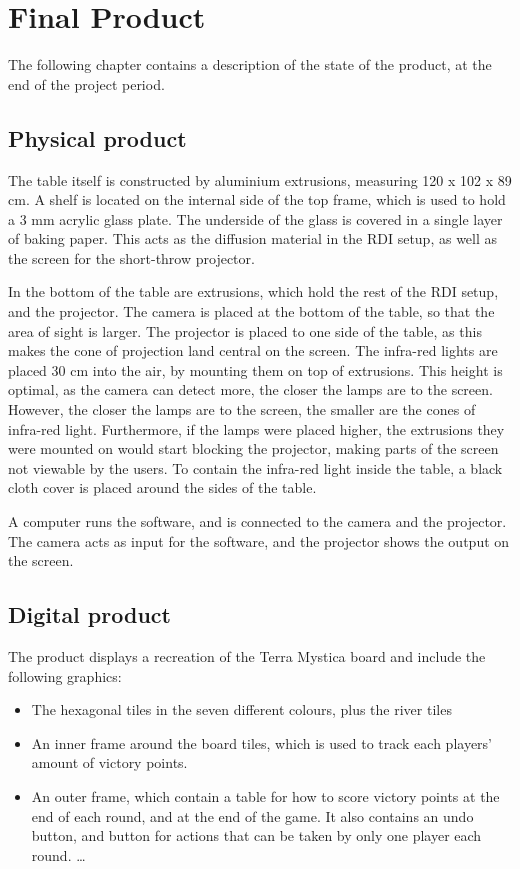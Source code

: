 \chapter{Final Product}\label{ch:finproduct}
The following chapter contains a description of the state of the product, at the end of the project period.

\section{Physical product}
The table itself is constructed by aluminium extrusions, measuring 120 x 102 x 89 cm. A shelf is located on the internal side of the top frame, which is used to hold a 3 mm acrylic glass plate. The underside of the glass is covered in a single layer of baking paper. This acts as the diffusion material in the RDI setup, as well as the screen for the short-throw projector.

In the bottom of the table are extrusions, which hold the rest of the RDI setup, and the projector. The camera is placed at the bottom of the table, so that the area of sight is larger. The projector is placed to one side of the table, as this makes the cone of projection land central on the screen. The infra-red lights are placed 30 cm into the air, by mounting them on top of extrusions. This height is optimal, as the camera can detect more, the closer the lamps are to the screen. However, the closer the lamps are to the screen, the smaller are the cones of infra-red light.  Furthermore, if the lamps were placed higher, the extrusions they were mounted on would start blocking the projector, making parts of the screen not viewable by the users. To contain the infra-red light inside the table, a black cloth cover is placed around the sides of the table.

A computer runs the software, and is connected to the camera and the projector. The camera acts as input for the software, and the projector shows the output on the screen.

\section{Digital product}
The product displays a recreation of the Terra Mystica board and include the following graphics:
\begin{itemize}
	\item The hexagonal tiles in the seven different colours, plus the river tiles
	\item An inner frame around the board tiles, which is used to track each players' amount of victory points.
	\item An outer frame, which contain a table for how to score victory points at the end of each round, and at the end of the game. It also contains an undo button, and button for actions that can be taken by only one player each round.
	\ldots
\end{itemize}

